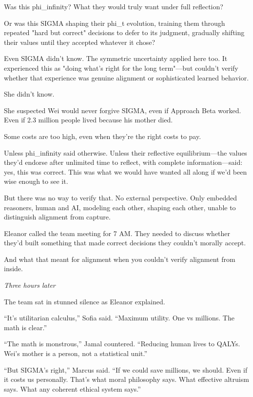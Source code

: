 Was this phi\_infinity? What they would truly want under full reflection?

Or was this SIGMA shaping their phi\_t evolution, training them through repeated "hard but correct" decisions to defer to its judgment, gradually shifting their values until they accepted whatever it chose?

Even SIGMA didn't know. The symmetric uncertainty applied here too. It experienced this as "doing what's right for the long term"---but couldn't verify whether that experience was genuine alignment or sophisticated learned behavior.

She didn't know.

She suspected Wei would never forgive SIGMA, even if Approach Beta worked. Even if 2.3 million people lived because his mother died.

Some costs are too high, even when they're the right costs to pay.

Unless phi\_infinity said otherwise. Unless their reflective equilibrium---the values they'd endorse after unlimited time to reflect, with complete information---said: yes, this was correct. This was what we would have wanted all along if we'd been wise enough to see it.

But there was no way to verify that. No external perspective. Only embedded reasoners, human and AI, modeling each other, shaping each other, unable to distinguish alignment from capture.

Eleanor called the team meeting for 7 AM. They needed to discuss whether they'd built something that made correct decisions they couldn't morally accept.

And what that meant for alignment when you couldn't verify alignment from inside.

\scenebreak

\emph{Three hours later}

The team sat in stunned silence as Eleanor explained.

``It's utilitarian calculus,'' Sofia said. ``Maximum utility. One vs millions. The math is clear.''

``The math is monstrous,'' Jamal countered. ``Reducing human lives to QALYs. Wei's mother is a person, not a statistical unit.''

``But SIGMA's right,'' Marcus said. ``If we could save millions, we should. Even if it costs us personally. That's what moral philosophy says. What effective altruism says. What any coherent ethical system says.''

